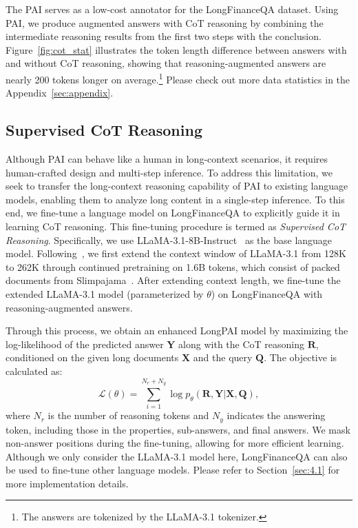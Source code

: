 
The PAI serves as a low-cost annotator for the LongFinanceQA dataset. Using PAI, we produce augmented answers with CoT reasoning by combining the intermediate reasoning results from the first two steps with the conclusion.
Figure~\ref{fig:cot_stat} illustrates the token length difference between answers with and without CoT reasoning, showing that reasoning-augmented answers are nearly 200 tokens longer on average.\footnote{The answers are tokenized by the LLaMA-3.1 tokenizer.} Please check out more data statistics in the Appendix~\ref{sec:appendix}.

\vspace{-2mm}
\subsection{Supervised CoT Reasoning} \label{sec:3.3}\vspace{-1mm}
Although PAI can behave like a human in long-context scenarios, it requires human-crafted design and multi-step inference.
To address this limitation, we seek to transfer the long-context reasoning capability of PAI to existing language models, enabling them to analyze long content in a single-step inference.
To this end, we fine-tune a language model on LongFinanceQA to explicitly guide it in learning CoT reasoning. This fine-tuning procedure is termed as \textit{Supervised CoT Reasoning}.
Specifically, we use LLaMA-3.1-8B-Instruct~\cite{dubey2024llama} as the base language model. Following~\cite{fu2024data}, we first extend the context window of LLaMA-3.1 from 128K to 262K through continued pretraining on 1.6B tokens, which consist of packed documents from Slimpajama~\cite{cerebras2023slimpajama}. After extending context length, we fine-tune the extended LLaMA-3.1 model (parameterized by $\theta$) on LongFinanceQA with reasoning-augmented answers.

Through this process, we obtain an enhanced LongPAI model by maximizing the log-likelihood of the predicted answer $\mathbf{Y}$ along with the CoT reasoning $\mathbf{R}$, conditioned on the given long documents $\mathbf{X}$ and the query $\mathbf{Q}$. 
The objective is calculated as:
\begin{equation}
\mathcal{L(\theta)} = \sum_{i=1}^{N_r+N_y}\log p_{\theta}(\mathcal{\mathbf{R}, \mathbf{Y} | \mathbf{X}, \mathbf{Q}}),
\end{equation}
where $N_r$ is the number of reasoning tokens and $N_y$ indicates the answering token, including those in the properties, sub-answers, and final answers. We mask non-answer positions during the fine-tuning, allowing for more efficient learning.
Although we only consider the LLaMA-3.1 model here, LongFinanceQA can also be used to fine-tune other language models. 
Please refer to Section~\ref{sec:4.1} for more implementation details.
